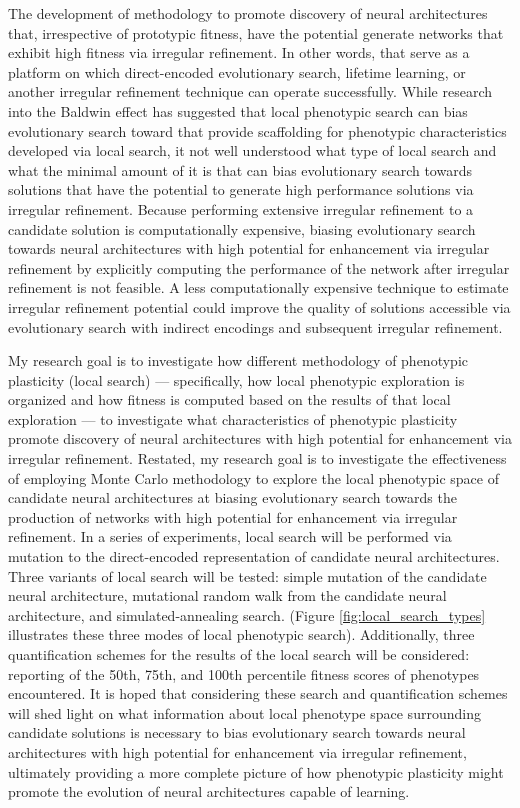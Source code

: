 \begin{figure}
     \label{fig:baldwin_effect}
\end{figure}

The development of methodology to promote discovery of neural architectures that, irrespective of prototypic fitness, have the potential generate networks that exhibit high fitness via irregular refinement. In other words, that serve as a platform on which direct-encoded evolutionary search, lifetime learning, or another irregular refinement technique can operate successfully. While research into the Baldwin effect has suggested that local phenotypic search can bias evolutionary search toward that provide scaffolding for phenotypic characteristics developed via local search, it not well understood what type of local search and what the minimal amount of it is that can bias evolutionary search towards solutions that have the potential to generate high performance solutions via irregular refinement. Because performing extensive irregular refinement to a candidate solution is computationally expensive, biasing evolutionary search towards neural architectures with high potential for enhancement via irregular refinement by explicitly computing the performance of the network after irregular refinement is not feasible. A less computationally expensive technique to estimate irregular refinement potential could improve the quality of solutions accessible via evolutionary search with indirect encodings and subsequent irregular refinement.

My research goal is to investigate how different methodology of phenotypic plasticity (local search) --- specifically, how local phenotypic exploration is organized and how fitness is computed based on the results of that local exploration --- to investigate what characteristics of phenotypic plasticity promote discovery of neural architectures with high potential for enhancement via irregular refinement. Restated, my research goal is to investigate the effectiveness of employing Monte Carlo methodology to explore the local phenotypic space of candidate neural architectures  at biasing evolutionary search towards the production of networks with high potential for enhancement via irregular refinement. In a series of experiments, local search will be performed via mutation to the direct-encoded representation of candidate neural architectures. Three variants of local search will be tested: simple mutation of the candidate neural architecture, mutational random walk from the candidate neural architecture, and simulated-annealing search. (Figure \ref{fig:local_search_types} illustrates these three modes of local phenotypic search). Additionally, three quantification schemes for the results of the local search will be considered: reporting of the 50th, 75th, and 100th percentile fitness scores of phenotypes encountered. It is hoped that considering these search and quantification schemes will shed light on what information about local phenotype space surrounding candidate solutions is necessary to bias evolutionary search towards neural architectures with high potential for enhancement via irregular refinement, ultimately providing a more complete picture of how phenotypic plasticity might promote the evolution of neural architectures capable of learning.

